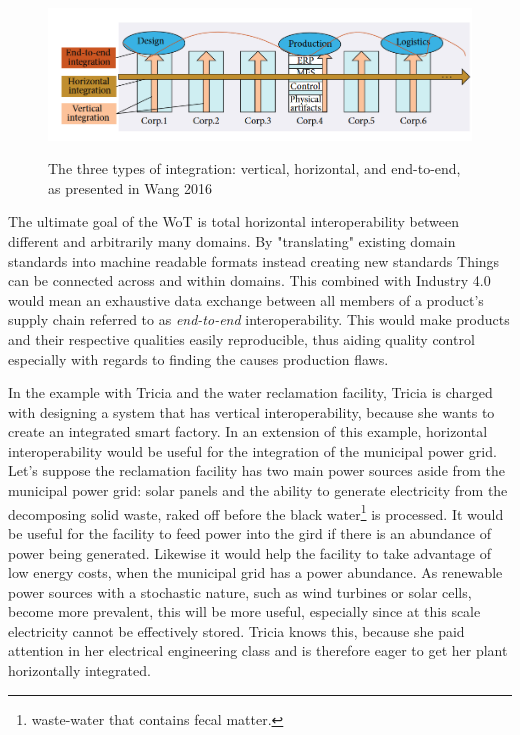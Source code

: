 \begin{figure}[th]
\centering
\includegraphics[width=\textwidth]{Figures/integration.png}
\caption{The three types of integration: vertical, horizontal, and end-to-end, as presented in Wang 2016}
\cite{wang2016implementing}
\label{fig:wangIntegration}
\end{figure}

The ultimate goal of the WoT is total horizontal interoperability between different and arbitrarily many domains. By "translating" existing domain standards into machine readable formats instead creating new standards Things can be connected across and within domains\cite{MichahellesWoS}. This combined with Industry 4.0 would mean an exhaustive data exchange between all members of a product's supply chain referred to as \textit{end-to-end} interoperability. This would make products and their respective qualities easily reproducible\cite{wang2016implementing}, thus aiding quality control especially with regards to finding the causes production flaws.

In the example with Tricia and the water reclamation facility, Tricia is charged with designing a system that has vertical interoperability, because she wants to create an integrated smart factory. In an extension of this example, horizontal interoperability would be useful for the integration of the municipal power grid. Let's suppose the reclamation facility has two main power sources aside from the municipal power grid: solar panels and the ability to generate electricity from the decomposing solid waste, raked off before the black water\footnote{waste-water that contains fecal matter.} is processed. It would be useful for the facility to feed power into the gird if there is an abundance of power being generated. Likewise it would help the facility to take advantage of low energy costs, when the municipal grid has a power abundance. As renewable power sources with a stochastic nature, such as wind turbines or solar cells, become more prevalent, this will be more useful, especially since at this scale electricity cannot be effectively stored. Tricia knows this, because she paid attention in her electrical engineering class and is therefore eager to get her plant horizontally integrated.




